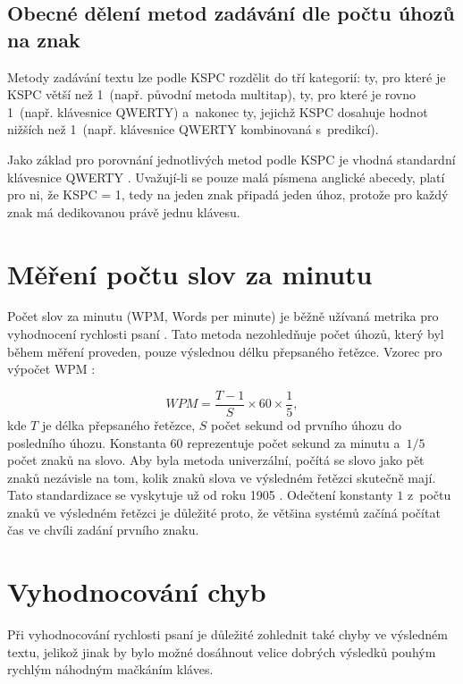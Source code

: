 \documentclass[a4paper,11pt,openany]{book} %
\begin{document}
\subsection{Obecné dělení metod zadávání dle počtu úhozů na znak}

Metody zadávání textu lze podle KSPC rozdělit do tří kategorií: ty, pro které je KSPC větší než 1~(např. původní metoda multitap), ty, pro které je rovno 1~(např. klávesnice QWERTY) a~nakonec ty, jejichž KSPC dosahuje hodnot nižších než 1~(např. klávesnice QWERTY kombinovaná s~predikcí). %

Jako základ pro porovnání jednotlivých metod podle KSPC je vhodná standardní klávesnice QWERTY \parencite{arif2009analysis}. %
Uvažují-li se pouze malá písmena anglické abecedy, platí pro ni, že KSPC = 1, tedy na jeden znak připadá jeden úhoz, protože pro každý znak má dedikovanou právě jednu klávesu.

\section{Měření počtu slov za minutu}

Počet slov za minutu (WPM, Words per minute) je běžně užívaná metrika pro vyhodnocení rychlosti psaní \parencite{tarvainen2010beginner}. %
Tato metoda nezohledňuje počet úhozů, který byl během měření proveden, pouze výslednou délku přepsaného řetězce. Vzorec pro výpočet WPM \parencite[48]{wobbrockjacobo.2007}:

\[
	WPM = \frac{T - 1}{S} \times 60 \times \frac{1}{5},
\]
kde $T$ je délka přepsaného řetězce, $S$ počet sekund od prvního úhozu do posledního úhozu. Konstanta $60$ reprezentuje počet sekund za minutu a~$1/5$ počet znaků na slovo. Aby byla metoda univerzální, počítá se slovo jako pět znaků nezávisle na tom, kolik znaků slova ve výsledném řetězci skutečně mají. Tato standardizace se vyskytuje už od roku 1905 \parencite{yamada1980historical}. Odečtení konstanty $1$ z~počtu znaků ve výsledném řetězci je důležité proto, že většina systémů začíná počítat čas ve chvíli zadání prvního znaku. \parencite[49]{wobbrockjacobo.2007}

\section{Vyhodnocování chyb}

Při vyhodnocování rychlosti psaní je důležité zohlednit také chyby ve výsledném textu, jelikož jinak by bylo možné dosáhnout velice dobrých výsledků pouhým rychlým náhodným mačkáním kláves.
\end{document}
